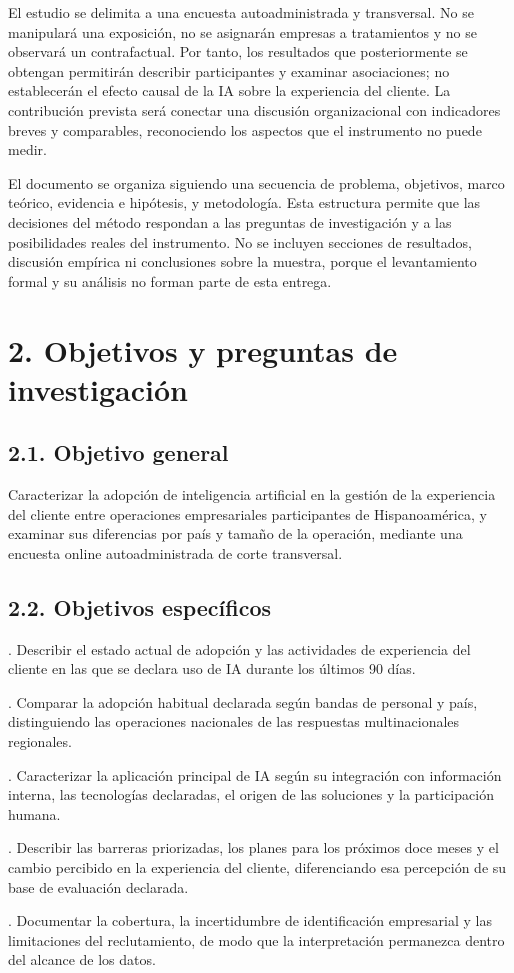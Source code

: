 \documentclass[12pt,letterpaper]{article}
\begin{document}
El estudio se delimita a una encuesta autoadministrada y transversal. No se manipulará una exposición, no se asignarán empresas a tratamientos y no se observará un contrafactual. Por tanto, los resultados que posteriormente se obtengan permitirán describir participantes y examinar asociaciones; no establecerán el efecto causal de la IA sobre la experiencia del cliente. La contribución prevista será conectar una discusión organizacional con indicadores breves y comparables, reconociendo los aspectos que el instrumento no puede medir.

El documento se organiza siguiendo una secuencia de problema, objetivos, marco teórico, evidencia e hipótesis, y metodología. Esta estructura permite que las decisiones del método respondan a las preguntas de investigación y a las posibilidades reales del instrumento. No se incluyen secciones de resultados, discusión empírica ni conclusiones sobre la muestra, porque el levantamiento formal y su análisis no forman parte de esta entrega.

\section*{2. Objetivos y preguntas de investigación}
\subsection*{2.1. Objetivo general}
Caracterizar la adopción de inteligencia artificial en la gestión de la experiencia del cliente entre operaciones empresariales participantes de Hispanoamérica, y examinar sus diferencias por país y tamaño de la operación, mediante una encuesta online autoadministrada de corte transversal.

\subsection*{2.2. Objetivos específicos}
. Describir el estado actual de adopción y las actividades de experiencia del cliente en las que se declara uso de IA durante los últimos 90 días.\par
{}. Comparar la adopción habitual declarada según bandas de personal y país, distinguiendo las operaciones nacionales de las respuestas multinacionales regionales.\par
{}. Caracterizar la aplicación principal de IA según su integración con información interna, las tecnologías declaradas, el origen de las soluciones y la participación humana.\par
{}. Describir las barreras priorizadas, los planes para los próximos doce meses y el cambio percibido en la experiencia del cliente, diferenciando esa percepción de su base de evaluación declarada.\par
{}. Documentar la cobertura, la incertidumbre de identificación empresarial y las limitaciones del reclutamiento, de modo que la interpretación permanezca dentro del alcance de los datos.\par
\end{document}
